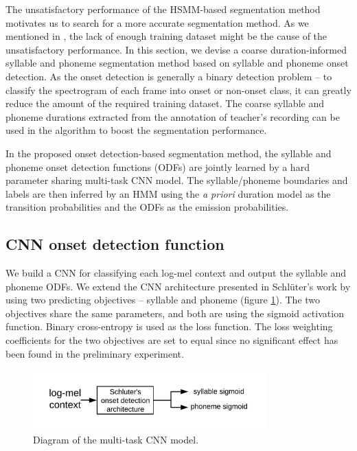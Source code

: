 The unsatisfactory performance of the HSMM-based segmentation method motivates us to search for a more accurate segmentation method. As we mentioned in , the lack of enough training dataset might be the cause of the unsatisfactory performance. In this section, we devise a coarse duration-informed syllable and phoneme segmentation method based on syllable and phoneme onset detection. As the onset detection is generally a binary detection problem -- to classify the spectrogram of each frame into onset or non-onset class, it can greatly reduce the amount of the required training dataset. The coarse syllable and phoneme durations extracted from the annotation of teacher's recording can be used in the algorithm to boost the segmentation performance.

In the proposed onset detection-based segmentation method, the syllable and phoneme onset detection functions (ODFs) are jointly learned by a hard parameter sharing multi-task CNN model. The syllable/phoneme boundaries and labels are then inferred by an HMM using the \textit{a priori} duration model as the transition probabilities and the ODFs as the emission probabilities.

\subsection{CNN onset detection function}\label{sec:ch5:cnn_odf}

We build a CNN for classifying each log-mel context and output the syllable and phoneme ODFs. We extend the CNN architecture presented in Schl\"{u}ter's work \cite{Schluter2014} by using two predicting objectives -- syllable and phoneme (figure \ref{fig:cnn_architecture}). The two objectives share the same parameters, and both are using the sigmoid activation function. Binary cross-entropy is used as the loss function. The loss weighting coefficients for the two objectives are set to equal since no significant effect has been found in the preliminary experiment.

\begin{figure}[ht!]
    \centering
    \includegraphics[width=0.8\textwidth]{figs/blockDiags_rong/ch5_cnn_architecture_segmentation.png}
    \caption{Diagram of the multi-task CNN model.}
    \label{fig:cnn_architecture}
\end{figure}

